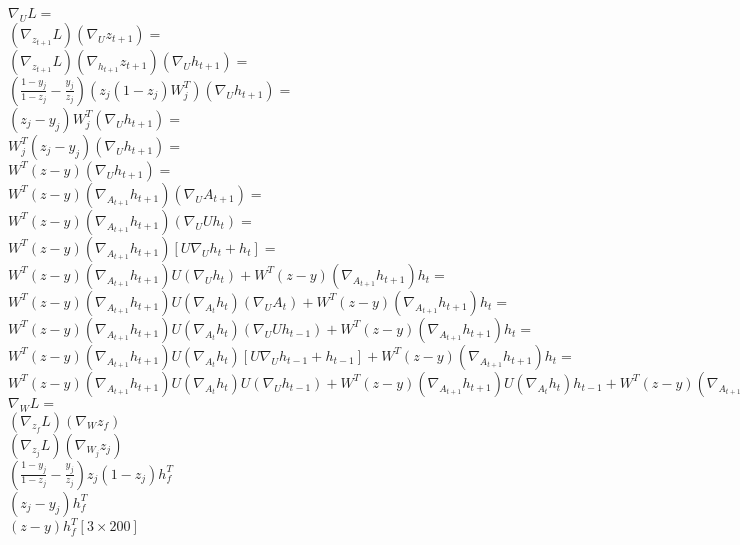 \documentclass[landscape]{report}
\newcommand{\tab}{\-\hspace{0.5cm}}
\begin{document}
$\nabla_{U} L =$\\
$\left(\nabla_{z_{t+1}} L \right)\left( \nabla_{U} z_{t+1}\right) =$\\
$ \left(\nabla_{z_{t+1}} L \right) \left(\nabla_{h_{t+1}} z_{t+1}\right) \left( \nabla_{U} h_{t+1} \right) = $\\
$ \left( \frac{1-y_j}{1-z_j} - \frac{y_j}{z_j} \right)\left(z_j(1-z_j)W_j^T\right)\left( \nabla_{U} h_{t+1} \right) = $\\
$ \left( z_j - y_j \right)W_j^T \left( \nabla_{U} h_{t+1} \right) = $\\
$ W_j^T\left( z_j - y_j \right) \left( \nabla_{U} h_{t+1} \right) = $\\
$ W^T(z-y) \left( \nabla_{U} h_{t+1} \right) = $\\
$ W^T(z-y) \left( \nabla_{A_{t+1}} h_{t+1} \right)\left(\nabla_{U} A_{t+1}\right) =$\\
$ W^T(z-y) \left( \nabla_{A_{t+1}} h_{t+1} \right)\left(\nabla_{U} U h_t \right) = $\\
$ W^T(z-y) \left( \nabla_{A_{t+1}} h_{t+1} \right)\left[U \nabla_{U} h_t + h_t \right] = $\\
$ W^T(z-y) \left( \nabla_{A_{t+1}} h_{t+1} \right)U \left( \nabla_{U} h_t \right) + W^T(z-y) \left( \nabla_{A_{t+1}} h_{t+1} \right) h_t = $\\
$ W^T(z-y) \left( \nabla_{A_{t+1}} h_{t+1} \right)U \left( \nabla_{A_{t}} h_{t} \right)\left(\nabla_{U} A_{t}\right) + W^T(z-y) \left( \nabla_{A_{t+1}} h_{t+1} \right) h_t = $\\
$ W^T(z-y) \left( \nabla_{A_{t+1}} h_{t+1} \right)U \left( \nabla_{A_{t}} h_{t} \right)\left(\nabla_{U} U h_{t-1}\right) + W^T(z-y) \left( \nabla_{A_{t+1}} h_{t+1} \right) h_t = $\\
$ W^T(z-y) \left( \nabla_{A_{t+1}} h_{t+1} \right)U \left( \nabla_{A_{t}} h_{t} \right)\left[U \nabla_{U} h_{t-1} + h_{t-1} \right] + W^T(z-y) \left( \nabla_{A_{t+1}} h_{t+1} \right) h_t = $\\
$ W^T(z-y) \left( \nabla_{A_{t+1}} h_{t+1} \right)U \left( \nabla_{A_{t}} h_{t} \right)U \left(\nabla_{U} h_{t-1}\right) + W^T(z-y) \left( \nabla_{A_{t+1}} h_{t+1} \right)U \left( \nabla_{A_{t}} h_{t} \right)h_{t-1} + W^T(z-y) \left( \nabla_{A_{t+1}} h_{t+1} \right) h_t = $\\

$\nabla_W L = $\\
$\left(\nabla_{z_f} L \right)\left(\nabla_W z_f \right) $\\
$(\nabla_{z_j} L)(\nabla_{W_j} z_j)$\\
$ \left( \frac{1-y_j}{1-z_j} - \frac{y_j}{z_j} \right) z_j(1-z_j)h_f^T$\\
$ \left(z_j - y_j \right) h_f^T$\\
$ (z-y)h_f^T $\tab\footnotesize$[3\times200]$\normalsize\\
\end{document}
